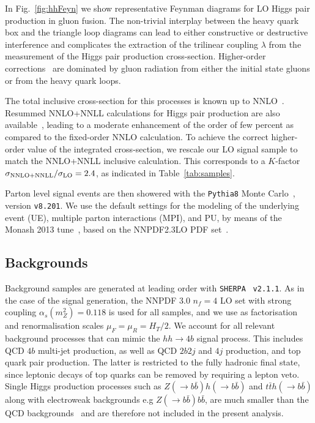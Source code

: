 In Fig.~\ref{fig:hhFeyn} we show representative Feynman diagrams
    for LO Higgs pair production in gluon fusion.
    The non-trivial interplay between the heavy quark box and the triangle loop diagrams
    can lead to either constructive or destructive interference
    and complicates the extraction of
    the trilinear coupling
    $\lambda$ from the measurement of the Higgs pair
    production cross-section.
    Higher-order corrections~\cite{deFlorian:2013jea,Frederix:2014hta}
    are dominated by gluon radiation
    from either the initial state gluons or from the heavy quark loops.

    The total inclusive cross-section for this processes is
    known up to NNLO~\cite{deFlorian:2013jea}.
    Resummed NNLO+NNLL calculations for Higgs pair production are
    also available~\cite{deFlorian:2015moa},
leading to a moderate enhancement of the order of
few percent as compared to the fixed-order NNLO calculation.
%
To achieve the correct higher-order value of the
integrated cross-section, we rescale our LO signal sample to match the
NNLO+NNLL
inclusive calculation.
%
This corresponds to
a $K$-factor $\sigma_{\rm NNLO+NNLL}/\sigma_{\rm LO}=2.4$, as indicated
in Table~\ref{tab:samples}.

Parton level signal events are then showered with the {\tt Pythia8} Monte
Carlo~\cite{Sjostrand:2007gs,Sjostrand:2014zea}, version {\tt v8.201}.
%
We use the default settings for the modeling
of the underlying event (UE), multiple parton
interactions (MPI), and PU, by means
of the Monash 2013 tune~\cite{Skands:2014pea},
based on the NNPDF2.3LO PDF set~\cite{Ball:2012cx,Ball:2013hta}.
%

\subsection{Backgrounds}

Background samples are generated at leading order
with {\tt SHERPA}~\cite{Gleisberg:2008ta} {\tt v2.1.1}.
%
As in the case of the signal generation,
the NNPDF 3.0 $n_f = 4$ LO set with strong coupling
$\alpha_s(m_Z^2)=0.118$ is used for all samples, and
we use as
factorisation and renormalisation scales $\mu_F=\mu_R=H_T/2$.
%
We account for all relevant background
processes that can mimic the
 $hh\to 4b$ signal process.
%
This includes  QCD $4b$ multi-jet production, as well as
QCD $2b2j$ and $4j$ production, and top quark pair
production.
%
The latter is restricted to the fully hadronic final state,
since 
leptonic decays of top quarks can be removed by requiring
a lepton veto.
%
Single Higgs production processes such as $Z(\to b\bar{b})h(\to b\bar{b})$
and $t\bar{t}h(\to b\bar{b})$ along with electroweak backgrounds e.g $Z(\to b\bar{b})b\bar{b}$,
are much smaller than the QCD backgrounds~\cite{Wardrope:2014kya,deLima:2014dta}
and are therefore not included in the present analysis.
%

